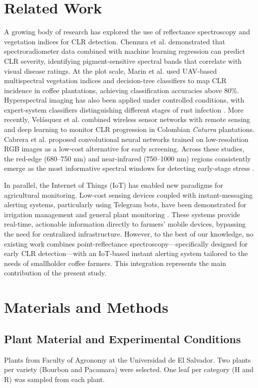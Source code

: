 \documentclass[conference]{IEEEtran}
\begin{document}
\section{Related Work}
A growing body of research has explored the use of reflectance spectroscopy and vegetation indices for CLR detection. Chemura et al. \cite{chemuramutanga2018} demonstrated that spectroradiometer data combined with machine learning regression can predict CLR severity, identifying pigment-sensitive spectral bands that correlate with visual disease ratings. At the plot scale, Marin et al. \cite{marin2021} used UAV-based multispectral vegetation indices and decision-tree classifiers to map CLR incidence in coffee plantations, achieving classification accuracies above 80\%. Hyperspectral imaging has also been applied under controlled conditions, with expert-system classifiers distinguishing different stages of rust infection \cite{castro2018}. More recently, Velásquez et al. \cite{velasquez2020} combined wireless sensor networks with remote sensing and deep learning to monitor CLR progression in Colombian \textit{Caturra} plantations. Cabrera et al. \cite{cabrera2024} proposed convolutional neural networks trained on low-resolution RGB images as a low-cost alternative for early screening. Across these studies, the red-edge (680--750 nm) and near-infrared (750--1000 nm) regions consistently emerge as the most informative spectral windows for detecting early-stage stress \cite{oliveira2022}.

In parallel, the Internet of Things (IoT) has enabled new paradigms for agricultural monitoring. Low-cost sensing devices coupled with instant-messaging alerting systems, particularly using Telegram bots, have been demonstrated for irrigation management and general plant monitoring \cite{krishna2019,nyakuri2025,talaat2026}. These systems provide real-time, actionable information directly to farmers' mobile devices, bypassing the need for centralized infrastructure. However, to the best of our knowledge, no existing work combines point-reflectance spectroscopy—specifically designed for early CLR detection—with an IoT-based instant alerting system tailored to the needs of smallholder coffee farmers. This integration represents the main contribution of the present study.
\section{Materials and Methods}

\subsection{Plant Material and Experimental Conditions}
Plants from Faculty of Agronomy at the Universidad de El Salvador. Two plants per variety (Bourbon and Pacamara) were selected. One leaf per category (H and R) was sampled from each plant.
\end{document}
